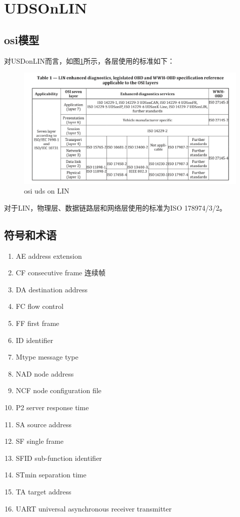 \section{UDSOnLIN}
\subsection{osi模型}

对USDonLIN而言，如图\ref{fig:usd_onlin}所示，各层使用的标准如下：
\begin{figure}[ht]
    \centering
    \includegraphics[]{./pic/osi_uds_onlin.png}
    \caption{osi uds on LIN}
    \label{fig:usd_onlin}
\end{figure}
对于LIN，物理层、数据链路层和网络层使用的标准为ISO 178974/3/2。

\subsection{符号和术语}

\begin{enumerate}
    \item AE address extension
    \item CF consecutive frame 连续帧
    \item DA destination address 
    \item FC flow control 
    \item FF first frame 
    \item ID identifier 
    \item Mtype message type 
    \item NAD node address 
    \item NCF node configuration file 
    \item P2 server response time 
    \item SA source address 
    \item SF single frame 
    \item SFID sub-function identifier 
    \item STmin separation time 
    \item TA target address 
    \item UART universal asynchronous receiver transmitter
\end{enumerate}